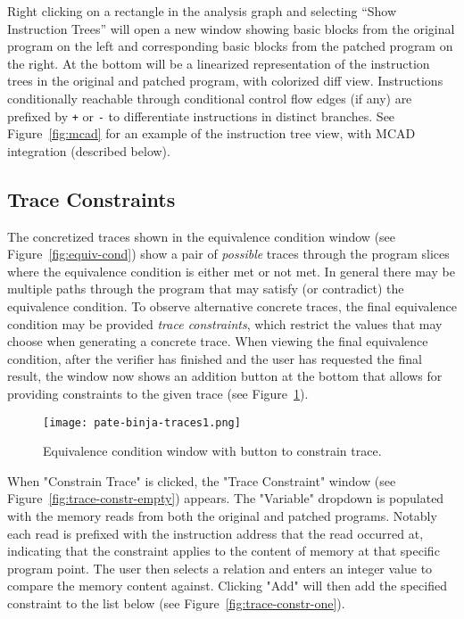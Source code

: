 Right clicking on a rectangle in the \pate{} analysis graph and selecting ``Show Instruction Trees'' will open a new window showing basic blocks from the original program on the left and corresponding basic blocks from the patched program on the right.
At the bottom will be a linearized representation of the instruction trees in the original and patched program, with colorized diff view.
Instructions conditionally reachable through conditional control flow edges (if any) are prefixed by \texttt{+} or \texttt{-} to differentiate instructions in distinct branches.
See Figure~\ref{fig:mcad} for an example of the instruction tree view, with MCAD integration (described below).

\subsection{Trace Constraints}

The concretized traces shown in the equivalence condition window (see Figure~\ref{fig:equiv-cond}) show a pair of \emph{possible} traces
through the program slices where the equivalence condition is either met or not met. In general there may be multiple paths through
the program that may satisfy (or contradict) the equivalence condition. To observe alternative concrete traces, the final equivalence
condition may be provided \emph{trace constraints}, which restrict the values that \pate{} may choose when generating a concrete trace.
When viewing the final equivalence condition, after the verifier has finished and the user has requested the final result, the window
now shows an addition button at the bottom that allows for providing constraints to the given trace (see Figure~\ref{fig:equiv-cond-full}).

\begin{figure}[h]
  \centering
  \texttt{[image: pate-binja-traces1.png]}
  \caption{Equivalence condition window with button to constrain trace.}
  \label{fig:equiv-cond-full}
\end{figure}

When "Constrain Trace" is clicked, the "Trace Constraint" window (see Figure~\ref{fig:trace-constr-empty}) appears. The
"Variable" dropdown is populated with the memory reads from both the original and patched programs. Notably each read
is prefixed with the instruction address that the read occurred at, indicating that the constraint applies to the content
of memory at that specific program point. The user then selects a relation and enters an integer value to compare the
memory content against. Clicking "Add" will then add the specified constraint to the list below (see Figure~\ref{fig:trace-constr-one}).


